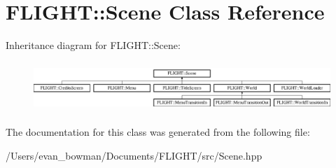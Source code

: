 \hypertarget{class_f_l_i_g_h_t_1_1_scene}{}\section{F\+L\+I\+G\+HT\+:\+:Scene Class Reference}
\label{class_f_l_i_g_h_t_1_1_scene}
Inheritance diagram for F\+L\+I\+G\+HT\+:\+:Scene\+:\begin{figure}[H]
\begin{center}
\leavevmode
\includegraphics[height=1.909091cm]{class_f_l_i_g_h_t_1_1_scene}
\end{center}
\end{figure}


The documentation for this class was generated from the following file\+:\begin{DoxyCompactItemize}
\item 
/\+Users/evan\+\_\+bowman/\+Documents/\+F\+L\+I\+G\+H\+T/src/Scene.\+hpp\end{DoxyCompactItemize}
